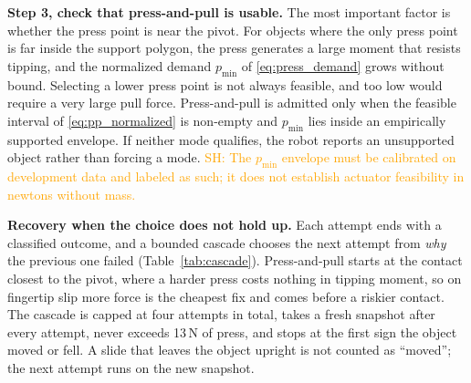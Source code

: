 \documentclass[10pt, conference]{IEEEtran}
\newcommand{\sh}[1]{\textcolor{orange}{SH: #1}}
\begin{document}
\noindent \textbf{Step 3, check that press-and-pull is usable.} The most important factor is whether the press point is near the pivot. For objects where the only press point is far inside the support polygon, the press generates a large moment that resists tipping, and the normalized demand $p_{\min}$ of \eqref{eq:press_demand} grows without bound. Selecting a lower press point is not always feasible, and too low would require a very large pull force. Press-and-pull is admitted only when the feasible interval of \eqref{eq:pp_normalized} is non-empty and $p_{\min}$ lies inside an empirically supported envelope. If neither mode qualifies, the robot reports an unsupported object rather than forcing a mode. \sh{The $p_{\min}$ envelope must be calibrated on development data and labeled as such; it does not establish actuator feasibility in newtons without mass.}

\noindent \textbf{Recovery when the choice does not hold up.} Each attempt ends with a classified outcome, and a bounded cascade chooses the next attempt from \emph{why} the previous one failed (Table~\ref{tab:cascade}). Press-and-pull starts at the contact closest to the pivot, where a harder press costs nothing in tipping moment, so on fingertip slip more force is the cheapest fix and comes before a riskier contact. The cascade is capped at four attempts in total, takes a fresh snapshot after every attempt, never exceeds 13\,N of press, and stops at the first sign the object moved or fell. A slide that leaves the object upright is not counted as ``moved''; the next attempt runs on the new snapshot.
\end{document}

